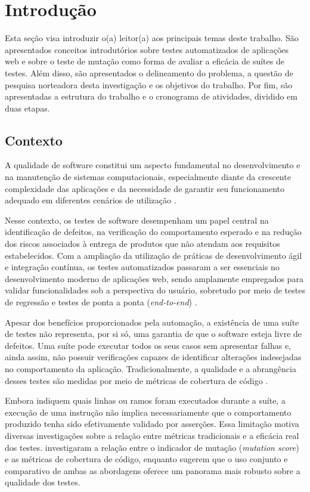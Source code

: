 \chapter{Introdução}

Esta seção visa introduzir o(a) leitor(a) aos principais temas deste trabalho. São apresentados conceitos introdutórios sobre testes automatizados de aplicações web e sobre o teste de mutação como forma de avaliar a eficácia de suítes de testes. Além disso, são apresentados o delineamento do problema, a questão de pesquisa norteadora desta investigação e os objetivos do trabalho. Por fim, são apresentadas a estrutura do trabalho e o cronograma de atividades, dividido em duas etapas.

\section{Contexto}

A qualidade de software constitui um aspecto fundamental no desenvolvimento e na manutenção de sistemas computacionais, especialmente diante da crescente complexidade das aplicações e da necessidade de garantir seu funcionamento adequado em diferentes cenários de utilização \cite{kochhar2015code}.

Nesse contexto, os testes de software desempenham um papel central na identificação de defeitos, na verificação do comportamento esperado e na redução dos riscos associados à entrega de produtos que não atendam aos requisitos estabelecidos. Com a ampliação da utilização de práticas de desenvolvimento ágil e integração contínua, os testes automatizados passaram a ser essenciais no desenvolvimento moderno de aplicações web, sendo amplamente empregados para validar funcionalidades sob a perspectiva do usuário, sobretudo por meio de testes de regressão e testes de ponta a ponta (\textit{end-to-end}) \cite{yandrapally2021}.


Apesar dos benefícios proporcionados pela automação, a existência de uma suíte de testes não representa, por si só, uma garantia de que o software esteja livre de defeitos. Uma suíte pode executar todos os seus casos sem apresentar falhas e, ainda assim, não possuir verificações capazes de identificar alterações indesejadas no comportamento da aplicação. Tradicionalmente, a qualidade e a abrangência desses testes são medidas por meio de métricas de cobertura de código \cite{zhang2022}.

Embora indiquem quais linhas ou ramos foram executados durante a suíte, a execução de uma instrução não implica necessariamente que o comportamento produzido tenha sido efetivamente validado por asserções. Essa limitação motiva diversas investigações sobre a relação entre métricas tradicionais e a eficácia real dos testes.  investigaram a relação entre o indicador de mutação (\textit{mutation score}) e as métricas de cobertura de código, enquanto   sugerem que o uso conjunto e comparativo de ambas as abordagens oferece um panorama mais robusto sobre a qualidade dos testes.

